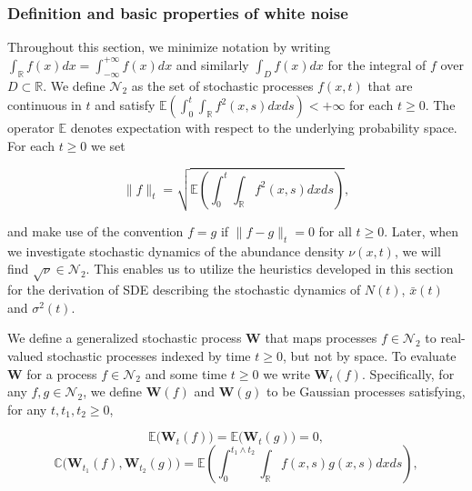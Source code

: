 \documentclass[]{elsarticle} %
\begin{document}
\hypertarget{definition-and-basic-properties-of-white-noise}{%
\subsubsection{\texorpdfstring{Definition and basic properties of white
noise
\label{wnc_intro}}{Definition and basic properties of white noise }}\label{definition-and-basic-properties-of-white-noise}}

Throughout this section, we minimize notation by writing
\(\int_{\mathbb{R}}f(x)dx=\int_{-\infty}^{+\infty}f(x)dx\) and similarly
\(\int_Df(x)dx\) for the integral of \(f\) over \(D\subset\mathbb{R}\).
We define \(\mathscr{N}_2\) as the set of stochastic processes
\(f(x,t)\) that are continuous in \(t\) and satisfy
\(\mathbb{E}\left(\int_0^t\int_\mathbb{R}f^2(x,s)dxds\right)<+\infty\)
for each \(t\geq0\). The operator \(\mathbb{E}\) denotes expectation
with respect to the underlying probability space. For each \(t\geq0\) we
set

\begin{equation}
\|f\|_t=\sqrt{\mathbb{E}\left(\int_0^t\int_\mathbb{R}f^2(x,s)dxds\right)},
\end{equation}

and make use of the convention \(f=g\) if \(\|f-g\|_t=0\) for all
\(t\geq0\). Later, when we investigate stochastic dynamics of the
abundance density \(\nu(x,t)\), we will find
\(\sqrt\nu\in\mathscr{N}_2\). This enables us to utilize the heuristics
developed in this section for the derivation of SDE describing the
stochastic dynamics of \(N(t)\), \(\bar x(t)\) and \(\sigma^2(t)\).

We define a generalized stochastic process \(\mathbf W\) that maps
processes \(f\in\mathscr{N}_2\) to real-valued stochastic processes
indexed by time \(t\geq0\), but not by space. To evaluate \(\mathbf W\)
for a process \(f\in\mathscr{N}_2\) and some time \(t\geq0\) we write
\(\mathbf W_t(f)\). Specifically, for any \(f,g\in\mathscr{N}_2\), we
define \(\mathbf W(f)\) and \(\mathbf W(g)\) to be Gaussian processes
satisfying, for any \(t,t_1,t_2\geq0\),

\begin{equation}\label{exp_WN}
\mathbb{E}\big(\mathbf W_t(f)\big)=\mathbb{E}\big(\mathbf W_t(g)\big)=0,
\end{equation} \begin{equation}\label{cov_WN}
\mathbb{C}\big(\mathbf W_{t_1}(f),\mathbf W_{t_2}(g)\big)=\mathbb{E}\left(\int_0^{t_1\wedge t_2}\int_\mathbb{R} f(x,s)g(x,s)dxds\right),
\end{equation}
\end{document}
